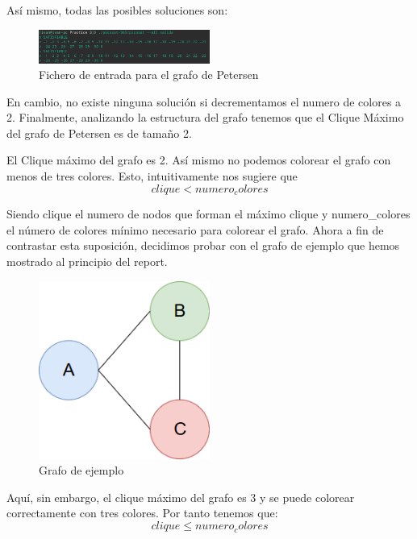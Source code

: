 \documentclass{article}
\begin{document}
    Así mismo, todas las posibles soluciones son: 
    \begin{figure}[H]
            \centering
            \includegraphics[width=0.5\textwidth]{pictures/solution_all.png}
            \caption{Fichero de entrada para el grafo de Petersen}
    \end{figure}
        
    En cambio, no existe ninguna solución si decrementamos el numero de colores a 2.
    Finalmente, analizando la estructura del grafo tenemos que el Clique Máximo del grafo de Petersen es de tamaño 2.  

    El Clique máximo del grafo es 2. Así mismo no podemos colorear el grafo con menos de tres colores. Esto, intuitivamente nos sugiere que 
    \[clique < numero_colores\]

Siendo clique el numero de nodos que forman el máximo clique y numero\_colores el número 
de colores mínimo necesario para colorear el grafo. Ahora a 
fin de contrastar esta suposición, decidimos probar con el grafo de ejemplo que hemos mostrado al principio del report. 
\begin{figure}[H]
    \centering
    \includegraphics[width=0.5\textwidth]{pictures/ejemplo.png}
    \caption{Grafo de ejemplo}
\end{figure}

Aquí, sin embargo, el clique máximo del grafo es 3 y se puede colorear correctamente con tres colores. Por tanto tenemos que:
    \[clique \leq numero_colores\]
    
\end{document}
